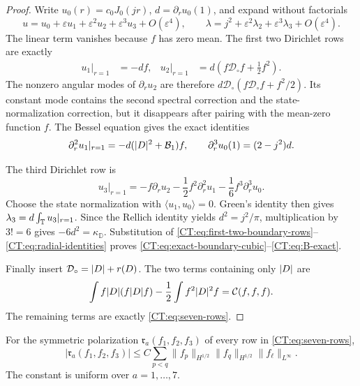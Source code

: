 \begin{proof}
Write $u_0(r)=c_0J_0(jr)$, $d=\partial_ru_0(1)$, and expand without
factorials
\begin{equation*}
 u=u_0+\varepsilon u_1+\varepsilon^2u_2+
   \varepsilon^3u_3+O(\varepsilon^4),
 \qquad
 \lambda=j^2+\varepsilon^2\lambda_2+
   \varepsilon^3\lambda_3+O(\varepsilon^4).
\end{equation*}
The linear term vanishes because $f$ has zero mean.  The first two
Dirichlet rows are exactly
\begin{align}
 u_1|_{r=1}&=-df,
 &u_2|_{r=1}
 &=d\left(f\mathcal D_\circ f+\frac12f^2\right).
 \label{CT:eq:first-two-boundary-rows}
\end{align}
The nonzero angular modes of $\partial_ru_2$ are therefore
$d\mathcal D_\circ(f\mathcal D_\circ f+f^2/2)$.  Its constant mode contains
the second spectral correction and the state-normalization correction, but
it disappears after pairing with the mean-zero function $f$.  The Bessel
equation gives the exact identities
\begin{equation}\label{CT:eq:radial-identities}
 \partial_r^2u_1|_{r=1}
 =-d(|D|^2+\mathcal B_1)f,
 \qquad
 \partial_r^3u_0(1)=(2-j^2)d.
\end{equation}

The third Dirichlet row is
\begin{equation*}
 u_3|_{r=1}
 =-f\partial_ru_2-\frac12f^2\partial_r^2u_1
   -\frac16f^3\partial_r^3u_0.
\end{equation*}
Choose the state normalization with $\langle u_1,u_0\rangle=0$.
Green's identity then gives
$\lambda_3=d\int_\mathbb T u_3|_{r=1}$.  Since the Rellich identity yields
$d^2=j^2/\pi$, multiplication by $3!=6$ gives
$-6d^2=\kappa_{\mathbb D}$.  Substitution of
\eqref{CT:eq:first-two-boundary-rows}--\eqref{CT:eq:radial-identities} proves
\eqref{CT:eq:exact-boundary-cubic}--\eqref{CT:eq:B-exact}.

Finally insert $\mathcal D_\circ=|D|+r(D)$.  The two terms containing
only $|D|$ are
\begin{equation*}
 \int f|D|(f|D| f)-\frac12\int f^2|D|^2f
 =\mathcal C(f,f,f).
\end{equation*}
The remaining terms are exactly \eqref{CT:eq:seven-rows}.
\end{proof}

\begin{lemma}
\label{CT:lem:seven-row-audit}
For the symmetric polarization $\mathfrak r_a(f_1,f_2,f_3)$ of every row
in \eqref{CT:eq:seven-rows},
\begin{equation}\label{CT:eq:seven-row-estimate}
 |\mathfrak r_a(f_1,f_2,f_3)|
 \le C\sum_{p<q}\|f_p\|_{H^{1/2}}
                    \|f_q\|_{H^{1/2}}
                    \|f_\ell\|_{L^\infty}.
\end{equation}
The constant is uniform over $a=1,\ldots,7$.
\end{lemma}

